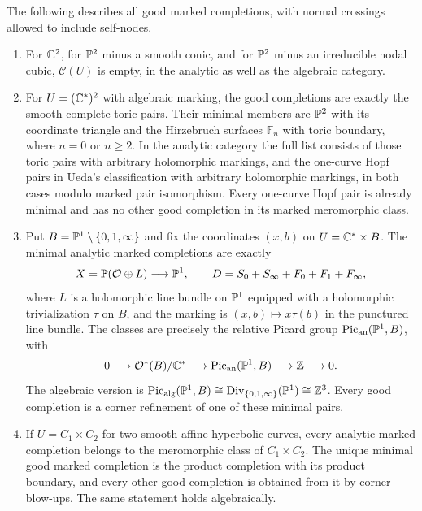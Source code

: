 \begin{theorem}
\label{P3a-examples}
The following describes all good marked completions, with normal
crossings allowed to include self-nodes.
\begin{enumerate}
\item For $\mathbb C^2$, for $\mathbb P^2$ minus a smooth conic, and for
$\mathbb P^2$ minus an irreducible nodal cubic, $\mathcal C(U)$ is empty,
in the analytic as well as the algebraic category.

\item For $U=(\mathbb C^*)^2$ with algebraic marking, the good completions
are exactly the smooth complete toric pairs. Their minimal members
are $\mathbb P^2$ with its coordinate triangle and the Hirzebruch surfaces
$\mathbb F_n$ with toric boundary, where $n=0$ or $n\geq2$.
In the analytic category the full list consists of those toric
pairs with arbitrary holomorphic markings, and the one-curve Hopf
pairs in Ueda's classification with arbitrary holomorphic markings,
in both cases modulo marked pair isomorphism. Every one-curve Hopf
pair is already minimal and has no other good completion in its
marked meromorphic class.

\item Put $B=\mathbb P^1\setminus\{0,1,\infty\}$ and fix the coordinates
$(x,b)$ on $U=\mathbb C^*\times B$. The minimal analytic marked completions
are exactly
\[
 X=\mathbb P(\mathcal O\oplus L)\longrightarrow\mathbb P^1,\qquad
 D=S_0+S_\infty+F_0+F_1+F_\infty,
\]
where $L$ is a holomorphic line bundle on $\mathbb P^1$ equipped with a
holomorphic trivialization $\tau$ on $B$, and the marking is
$(x,b)\mapsto x\tau(b)$ in the punctured line bundle. The classes
are precisely the relative Picard group
$\operatorname{Pic}_{\rm an}(\mathbb P^1,B)$, with
\[
 0\longrightarrow \mathcal O^*(B)/\mathbb C^*
 \longrightarrow\operatorname{Pic}_{\rm an}(\mathbb P^1,B)
 \longrightarrow\mathbb Z\longrightarrow0.
\]
The algebraic version is
$\operatorname{Pic}_{\rm alg}(\mathbb P^1,B)\cong
\operatorname{Div}_{\{0,1,\infty\}}(\mathbb P^1)\cong\mathbb Z^3$.
Every good completion is a corner refinement of one of these
minimal pairs.

\item If $U=C_1\times C_2$ for two smooth affine hyperbolic curves,
every analytic marked completion belongs to the meromorphic class
of $\overline C_1\times\overline C_2$. The unique minimal good
marked completion is the product completion with its product
boundary, and every other good completion is obtained from it by
corner blow-ups. The same statement holds algebraically.
\end{enumerate}
\end{theorem}
